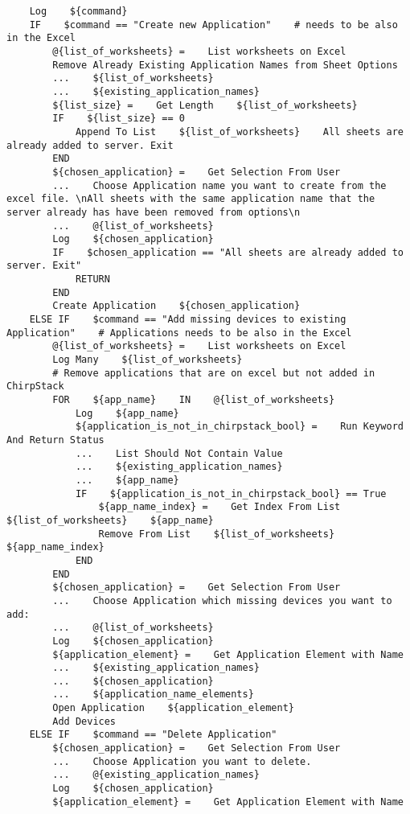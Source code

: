 \begin{verbatim}
    Log    ${command}
    IF    $command == "Create new Application"    # needs to be also in the Excel
        @{list_of_worksheets} =    List worksheets on Excel
        Remove Already Existing Application Names from Sheet Options
        ...    ${list_of_worksheets}
        ...    ${existing_application_names}
        ${list_size} =    Get Length    ${list_of_worksheets}
        IF    ${list_size} == 0
            Append To List    ${list_of_worksheets}    All sheets are already added to server. Exit
        END
        ${chosen_application} =    Get Selection From User
        ...    Choose Application name you want to create from the excel file. \nAll sheets with the same application name that the server already has have been removed from options\n
        ...    @{list_of_worksheets}
        Log    ${chosen_application}
        IF    $chosen_application == "All sheets are already added to server. Exit"
            RETURN
        END
        Create Application    ${chosen_application}
    ELSE IF    $command == "Add missing devices to existing Application"    # Applications needs to be also in the Excel
        @{list_of_worksheets} =    List worksheets on Excel
        Log Many    ${list_of_worksheets}
        # Remove applications that are on excel but not added in ChirpStack
        FOR    ${app_name}    IN    @{list_of_worksheets}
            Log    ${app_name}
            ${application_is_not_in_chirpstack_bool} =    Run Keyword And Return Status
            ...    List Should Not Contain Value
            ...    ${existing_application_names}
            ...    ${app_name}
            IF    ${application_is_not_in_chirpstack_bool} == True
                ${app_name_index} =    Get Index From List    ${list_of_worksheets}    ${app_name}
                Remove From List    ${list_of_worksheets}    ${app_name_index}
            END
        END
        ${chosen_application} =    Get Selection From User
        ...    Choose Application which missing devices you want to add:
        ...    @{list_of_worksheets}
        Log    ${chosen_application}
        ${application_element} =    Get Application Element with Name
        ...    ${existing_application_names}
        ...    ${chosen_application}
        ...    ${application_name_elements}
        Open Application    ${application_element}
        Add Devices
    ELSE IF    $command == "Delete Application"
        ${chosen_application} =    Get Selection From User
        ...    Choose Application you want to delete.
        ...    @{existing_application_names}
        Log    ${chosen_application}
        ${application_element} =    Get Application Element with Name

\end{verbatim}

